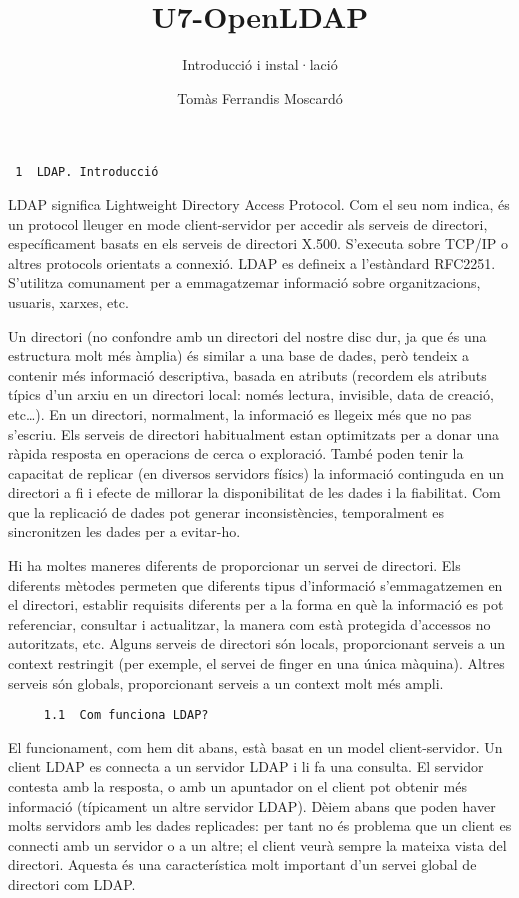 \documentclass[
  12 pt,
  a4paper,
]{article}
\title{U7-OpenLDAP}
\subtitle{Introducció i instal·lació}
\author{Tomàs Ferrandis Moscardó}
\date{}
\begin{document}
\maketitle

\begin{verbatim}
 1  LDAP. Introducció
\end{verbatim}

LDAP significa Lightweight Directory Access Protocol. Com el seu nom
indica, és un protocol lleuger en mode client-servidor per accedir als
serveis de directori, específicament basats en els serveis de directori
X.500. S'executa sobre TCP/IP o altres protocols orientats a connexió.
LDAP es defineix a l'estàndard RFC2251. S'utilitza comunament per a
emmagatzemar informació sobre organitzacions, usuaris, xarxes, etc.

Un directori (no confondre amb un directori del nostre disc dur, ja que
és una estructura molt més àmplia) és similar a una base de dades, però
tendeix a contenir més informació descriptiva, basada en atributs
(recordem els atributs típics d'un arxiu en un directori local: només
lectura, invisible, data de creació, etc\ldots). En un directori,
normalment, la informació es llegeix més que no pas s'escriu. Els
serveis de directori habitualment estan optimitzats per a donar una
ràpida resposta en operacions de cerca o exploració. També poden tenir
la capacitat de replicar (en diversos servidors físics) la informació
continguda en un directori a fi i efecte de millorar la disponibilitat
de les dades i la fiabilitat. Com que la replicació de dades pot generar
inconsistències, temporalment es sincronitzen les dades per a evitar-ho.

Hi ha moltes maneres diferents de proporcionar un servei de directori.
Els diferents mètodes permeten que diferents tipus d'informació
s'emmagatzemen en el directori, establir requisits diferents per a la
forma en què la informació es pot referenciar, consultar i actualitzar,
la manera com està protegida d'accessos no autoritzats, etc. Alguns
serveis de directori són locals, proporcionant serveis a un context
restringit (per exemple, el servei de finger en una única màquina).
Altres serveis són globals, proporcionant serveis a un context molt més
ampli.

\begin{verbatim}
     1.1  Com funciona LDAP?
\end{verbatim}

El funcionament, com hem dit abans, està basat en un model
client-servidor. Un client LDAP es connecta a un servidor LDAP i li fa
una consulta. El servidor contesta amb la resposta, o amb un apuntador
on el client pot obtenir més informació (típicament un altre servidor
LDAP). Dèiem abans que poden haver molts servidors amb les dades
replicades: per tant no és problema que un client es connecti amb un
servidor o a un altre; el client veurà sempre la mateixa vista del
directori. Aquesta és una característica molt important d'un servei
global de directori com LDAP.
\end{document}
